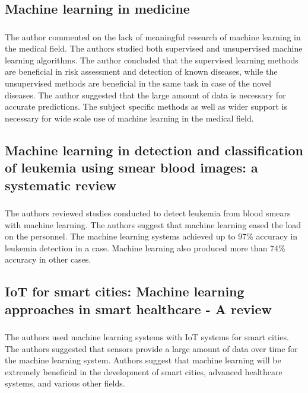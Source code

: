 \subsection{Machine learning in medicine}
\subsubsection{\citeauthor*{ref_paper_24} \citeyearpar{ref_paper_24}}

The author commented on the lack of meaningful research of machine learning in the medical field. The authors studied both supervised and unsupervised machine learning algorithms. The author concluded that the supervised learning methods are beneficial in risk assessment and detection of known diseases, while the unsupervised methods are beneficial in the same task in case of the novel diseases. The author suggested that the large amount of data is necessary for accurate predictions. The subject specific methods as well as wider support is necessary for wide scale use of machine learning in the medical field.

\subsection{Machine learning in detection and classification of leukemia using smear blood images: a systematic review}
\subsubsection{\citeauthor*{ref_paper_15} \citeyearpar{ref_paper_15}}

The authors reviewed studies conducted to detect leukemia from blood smears with machine learning. The authors suggest that machine learning eased the load on the personnel. The machine learning systems achieved up to 97\% accuracy in leukemia detection in a case. Machine learning also produced more than 74\% accuracy in other cases.

\subsection{IoT for smart cities: Machine learning approaches in smart healthcare - A review}
\subsubsection{\citeauthor*{ref_paper_29} \citeyearpar{ref_paper_29}}

The authors used machine learning systems with IoT systems for smart cities. The authors suggested that sensors provide a large amount of data over time for the machine learning system. Authors suggest that machine learning will be extremely beneficial in the development of smart cities, advanced healthcare systems, and various other fields.

